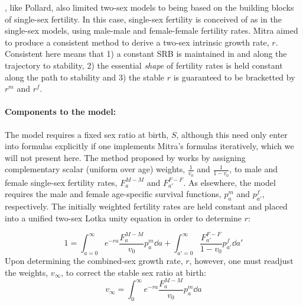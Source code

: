 \label{sec:mitraage}
\citet{mitra1978derivation}, like Pollard, also limited two-sex models to being
based on the building blocks of single-sex fertility. In this case, single-sex
fertility is conceived of as in the single-sex models, using male-male and female-female
fertility rates. Mitra aimed to produce a consistent
method to derive a two-sex intrinsic growth rate, $r$. Consistent here means 
that 1) a constant SRB is maintained in and along the trajectory to stability, 2) 
the essential \textit{shape} of fertility rates is held constant along the path 
to stability and 3) the stable $r$ is guaranteed to be bracketted by $r^m$ and $r^f$.

\paragraph{Components to the model: }
The model requires a fixed sex ratio at birth, $S$, although this need only
enter into formulas explicitly if one implements Mitra's formulas iteratively,
which we will not present here. The method proposed by \citet{mitra1978derivation} works
by assigning complementary scalar (uniform over age) weights, $\frac{1}{v_0}$ 
and $\frac{1}{1 - v_0}$, to male and female single-sex fertility rates, $F_a
^{M-M}$ and $F_{a'} ^{F-F}$. As elsewhere, the model requires the male
and female age-specific survival functions, $p_a^m$ and
$p_{a'}^f$, respectively. The initially weighted fertility rates are held
constant and placed into a unified two-sex Lotka unity equation in order to
determine $r$:

\begin{equation}
\label{eq:mitralotka}
1 = \int _{a=0} ^\infty e^{-r a} \frac{F_a ^{M-M}}{v_0} p_a^m \dd a + \int
_{a'=0} ^\infty \frac{F_{a'} ^{F-F}}{1 - v_0} p_{a'}^f \dd a'
\end{equation}
Upon determining the combined-sex growth rate, $r$, however, one must readjust
the weights, $v_\infty$, to correct the stable sex ratio at birth:
\begin{equation}
\label{eq:mitrastablev}
v_\infty = \int _0^\infty e^{-ra} \frac{F_a ^{M-M}}{v_0} p_a^m \dd a
\end{equation}

